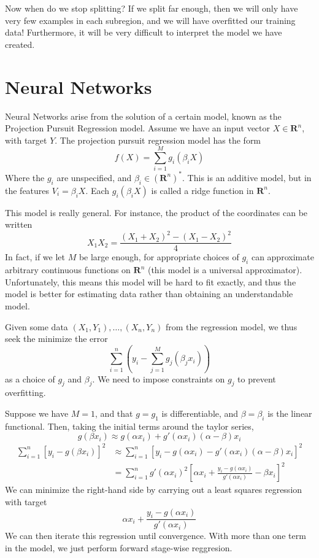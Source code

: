 Now when do we stop splitting? If we split far enough, then we will only have very few examples in each subregion, and we will have overfitted our training data! Furthermore, it will be very difficult to interpret the model we have created.

\chapter{Neural Networks}

Neural Networks arise from the solution of a certain model, known as the Projection Pursuit Regression model. Assume we have an input vector $X \in \mathbf{R}^n$, with target $Y$. The projection pursuit regression model has the form
%
\[ f(X) = \sum_{i = 1}^M g_i(\beta_i X) \]
%
Where the $g_i$ are unspecified, and $\beta_i \in (\mathbf{R}^n)^*$. This is an additive model, but in the features $V_i = \beta_i X$. Each $g_i(\beta_i X)$ is called a ridge function in $\mathbf{R}^n$.

This model is really general. For instance, the product of the coordinates can be written
%
\[ X_1X_2 = \frac{(X_1 + X_2)^2 - (X_1 - X_2)^2}{4} \]
%
In fact, if we let $M$ be large enough, for appropriate choices of $g_i$ can approximate arbitrary continuous functions on $\mathbf{R}^n$ (this model is a universal approximator). Unfortunately, this means this model will be hard to fit exactly, and thus the model is better for estimating data rather than obtaining an understandable model.

Given some data $(X_1, Y_1), \dots, (X_n, Y_n)$ from the regression model, we thus seek the minimize the error
%
\[ \sum_{i = 1}^n \left(y_i - \sum_{j = 1}^M g_j(\beta_j x_i) \right) \]
%
as a choice of $g_j$ and $\beta_j$. We need to impose constraints on $g_j$ to prevent overfitting.

Suppose we have $M = 1$, and that $g = g_1$ is differentiable, and $\beta = \beta_i$ is the linear functional. Then, taking the initial terms around the taylor series,
%
\[ g(\beta x_i) \approx g(\alpha x_i) + g'(\alpha x_i) (\alpha - \beta)x_i \]
%
\begin{align*}
    \sum_{i = 1}^n [y_i - g(\beta x_i)]^2 &\approx \sum_{i = 1}^n [y_i - g(\alpha x_i) - g'(\alpha x_i)(\alpha - \beta)x_i]^2\\
    &= \sum_{i = 1}^n g'(\alpha x_i)^2 \left[ \alpha x_i +  \frac{y_i - g(\alpha x_i)}{g'(\alpha x_i)} - \beta x_i \right]^2
\end{align*}
%
We can minimize the right-hand side by carrying out a least squares regression with target
%
\[ \alpha x_i + \frac{y_i - g(\alpha x_i)}{g'(\alpha x_i)} \]
%
We can then iterate this regression until convergence. With more than one term in the model, we just perform forward stage-wise reggresion.

